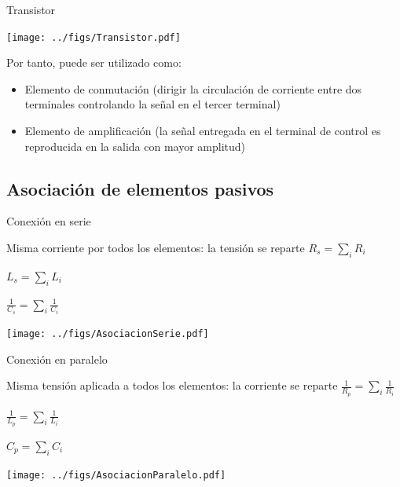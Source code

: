 \documentclass[xcolor={usenames,svgnames,dvipsnames}]{beamer}
\begin{document}
\begin{frame}[label={sec:org750ce17}]{Transistor}
\begin{center}
\texttt{[image: ../figs/Transistor.pdf]}
\end{center}

Por tanto, puede ser utilizado como:

\begin{itemize}
\item \alert{Elemento de conmutación} (dirigir la circulación de corriente entre
dos terminales controlando la señal en el tercer terminal)

\item \alert{Elemento de amplificación} (la señal entregada en el terminal de
control es reproducida en la salida con mayor amplitud)
\end{itemize}
\end{frame}

\subsection{Asociación de elementos pasivos}
\label{sec:org7a05210}

\begin{frame}[label={sec:org031f2bb}]{Conexión en serie}
\begin{block}{Misma corriente por todos los elementos: la tensión se reparte}
\(R_{s}=\sum_{i}R_{i}\)

\(L_{s}=\sum_{i}L_{i}\)

\(\frac{1}{C_{s}}=\sum_{i}\frac{1}{C_{i}}\)
\begin{center}
\texttt{[image: ../figs/AsociacionSerie.pdf]}
\end{center}
\end{block}
\end{frame}

\begin{frame}[label={sec:org771b296}]{Conexión en paralelo}
\begin{block}{Misma tensión aplicada a todos los elementos: la corriente se reparte}
\(\frac{1}{R_{p}}=\sum_{i}\frac{1}{R_{i}}\)

\(\frac{1}{L_{p}}=\sum_{i}\frac{1}{L_{i}}\)

\(C_{p}=\sum_{i}C_{i}\)
\begin{center}
\texttt{[image: ../figs/AsociacionParalelo.pdf]}
\end{center}
\end{block}
\end{frame}
\end{document}
